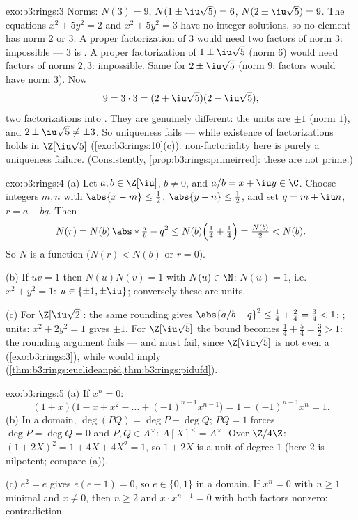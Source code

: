 \begin{solution}{exo:b3:rings:3}
Norms: $N(3) = 9$, $N(1 \pm \iu\sqrt5) = 6$, $N(2 \pm \iu\sqrt5) =
9$. The equations $x^2 + 5y^2 = 2$ and $x^2 + 5y^2 = 3$ have no
integer solutions, so no element has norm $2$ or $3$. A proper
factorization of $3$ would need two factors of norm $3$:
impossible --- $3$ is . A proper factorization of $1
\pm \iu\sqrt5$ (norm $6$) would need factors of norms $2, 3$:
impossible. Same for $2 \pm \iu\sqrt5$ (norm $9$: factors would
have norm $3$). Now
\[
9 = 3 \cdot 3 = (2 + \iu\sqrt5)(2 - \iu\sqrt5),
\]
two factorizations into . They are genuinely
different: the units are $\pm 1$ (norm $1$), and $2 \pm \iu\sqrt5
\neq \pm 3$. So uniqueness fails --- while existence of
factorizations holds in $\Z[\iu\sqrt5]$
(\cref{exo:b3:rings:10}(c)): non-factoriality here is purely a
uniqueness failure. (Consistently, \cref{prop:b3:rings:primeirred}:
these  are not prime.)
\end{solution}

\begin{solution}{exo:b3:rings:4}
(a) Let $a, b \in \Z[\iu]$, $b \neq 0$, and $a/b = x + \iu y \in
\C$. Choose integers $m, n$ with $\abs{x - m} \leq \frac12$,
$\abs{y - n} \leq \frac12$, and set $q = m + \iu n$, $r = a - bq$.
Then
\[
N(r) = N(b)\,\abs*{\tfrac ab - q}^2
\leq N(b)\Bigl(\tfrac14 + \tfrac14\Bigr) = \tfrac{N(b)}2 < N(b).
\]
So $N$ is a  function ($N(r) < N(b)$ or $r = 0$).

(b) If $uv = 1$ then $N(u)N(v) = 1$ with $N(u) \in \N$: $N(u) =
1$, i.e.\ $x^2 + y^2 = 1$: $u \in \{\pm 1, \pm\iu\}$; conversely
these are units.

(c) For $\Z[\iu\sqrt2]$: the same rounding gives $\abs{a/b - q}^2
\leq \frac14 + \frac{2}4 = \frac34 < 1$: ; units: $x^2 +
2y^2 = 1$ gives $\pm 1$. For $\Z[\iu\sqrt5]$ the bound becomes
$\frac14 + \frac54 = \frac32 > 1$: the rounding argument fails ---
and must fail, since $\Z[\iu\sqrt5]$ is not even a 
(\cref{exo:b3:rings:3}), while  would imply 
(\cref{thm:b3:rings:euclideanpid,thm:b3:rings:pidufd}).
\end{solution}

\begin{solution}{exo:b3:rings:5}
(a) If $x^n = 0$:
\[
(1 + x)\bigl(1 - x + x^2 - \dots + (-1)^{n-1}x^{n-1}\bigr)
= 1 + (-1)^{n-1}x^n = 1 .
\]
(b) In a domain, $\deg(PQ) = \deg P + \deg Q$; $PQ = 1$ forces
$\deg P = \deg Q = 0$ and $P, Q \in A^\times$: $A[X]^\times =
A^\times$. Over $\Z/4\Z$: $(1 + 2X)^2 = 1 + 4X + 4X^2 = 1$, so $1
+ 2X$ is a unit of degree $1$ (here $2$ is nilpotent; compare
(a)).

(c) $e^2 = e$ gives $e(e - 1) = 0$, so $e \in \{0, 1\}$ in a
domain. If $x^n = 0$ with $n \geq 1$ minimal and $x \ne 0$, then
$n \geq 2$ and $x \cdot x^{n-1} = 0$ with both factors nonzero:
contradiction.
\end{solution}


